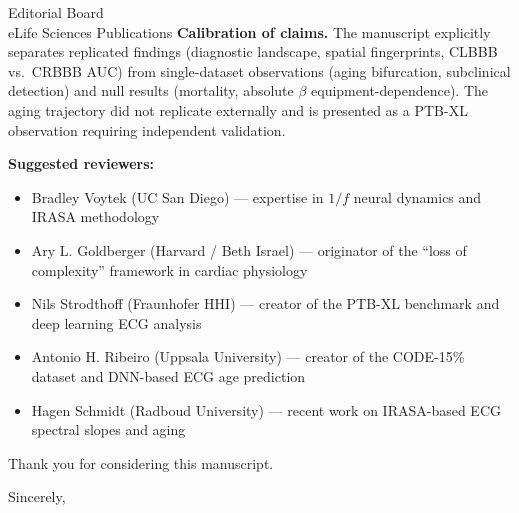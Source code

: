 \documentclass[11pt]{letter}
\begin{document}
\begin{letter}{Editorial Board\\eLife Sciences Publications}
\textbf{Calibration of claims.} The manuscript explicitly separates replicated findings (diagnostic landscape, spatial fingerprints, CLBBB vs.\ CRBBB AUC) from single-dataset observations (aging bifurcation, subclinical detection) and null results (mortality, absolute $\beta$ equipment-dependence). The aging trajectory did not replicate externally and is presented as a PTB-XL observation requiring independent validation.

\textbf{Suggested reviewers:}
\begin{itemize}
\item Bradley Voytek (UC San Diego) --- expertise in $1/f$ neural dynamics and IRASA methodology
\item Ary L. Goldberger (Harvard / Beth Israel) --- originator of the ``loss of complexity'' framework in cardiac physiology
\item Nils Strodthoff (Fraunhofer HHI) --- creator of the PTB-XL benchmark and deep learning ECG analysis
\item Antonio H. Ribeiro (Uppsala University) --- creator of the CODE-15\% dataset and DNN-based ECG age prediction
\item Hagen Schmidt (Radboud University) --- recent work on IRASA-based ECG spectral slopes and aging
\end{itemize}

Thank you for considering this manuscript.

\closing{Sincerely,}

\end{letter}
\end{document}
